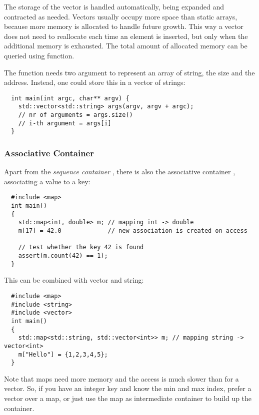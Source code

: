 The storage of the vector is handled automatically, being expanded and contracted as needed. Vectors usually occupy more space than static arrays, because more memory is allocated to handle future growth. This way a vector does not need to reallocate each time an element is inserted, but only when the additional memory is exhausted. The total amount of allocated memory can be queried using  function.

\begin{rem}
  The  function needs two argument to represent an array of string, the size and the address. Instead, one could
  store this in a vector of strings:
  \begin{verbatim}
  int main(int argc, char** argv) {
    std::vector<std::string> args(argv, argv + argc);
    // nr of arguments = args.size()
    // i-th argument = args[i]
  }
  \end{verbatim}
\end{rem}

\subsubsection{Associative Container}
Apart from the \emph{sequence container} , there is also the associative container , associating a value to a key:
\begin{verbatim}
  #include <map>
  int main()
  {
    std::map<int, double> m; // mapping int -> double
    m[17] = 42.0             // new association is created on access

    // test whether the key 42 is found
    assert(m.count(42) == 1);
  }
\end{verbatim}

This can be combined with vector and string:
\begin{verbatim}
  #include <map>
  #include <string>
  #include <vector>
  int main()
  {
    std::map<std::string, std::vector<int>> m; // mapping string -> vector<int>
    m["Hello"] = {1,2,3,4,5};
  }
\end{verbatim}

\begin{rem}
  Note that maps need more memory and the access is much slower than for a vector. So, if you have an integer key and know the min and max index, prefer a vector over a map, or just use the map as intermediate container to build up the container.
\end{rem}

